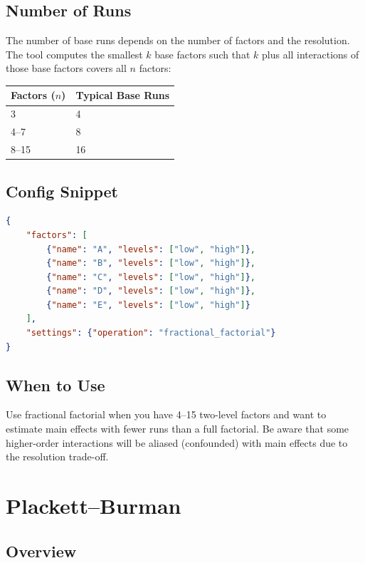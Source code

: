 \documentclass[11pt]{book}
\begin{document}
\subsection{Number of Runs}

The number of base runs depends on the number of factors and the resolution. The tool computes the smallest $k$ base factors such that $k$ plus all interactions of those base factors covers all $n$ factors:

\begin{table}[H]
\centering
\begin{tabular}{@{}ll@{}}
\toprule
\textbf{Factors ($n$)} & \textbf{Typical Base Runs} \\
\midrule
3 & 4 \\
4--7 & 8 \\
8--15 & 16 \\
\bottomrule
\end{tabular}
\end{table}

\subsection{Config Snippet}

\begin{lstlisting}[language=json]
{
    "factors": [
        {"name": "A", "levels": ["low", "high"]},
        {"name": "B", "levels": ["low", "high"]},
        {"name": "C", "levels": ["low", "high"]},
        {"name": "D", "levels": ["low", "high"]},
        {"name": "E", "levels": ["low", "high"]}
    ],
    "settings": {"operation": "fractional_factorial"}
}
\end{lstlisting}

\subsection{When to Use}

Use fractional factorial when you have 4--15 two-level factors and want to estimate main effects with fewer runs than a full factorial. Be aware that some higher-order interactions will be aliased (confounded) with main effects due to the resolution trade-off.

\section{Plackett--Burman}

\subsection{Overview}
\end{document}
